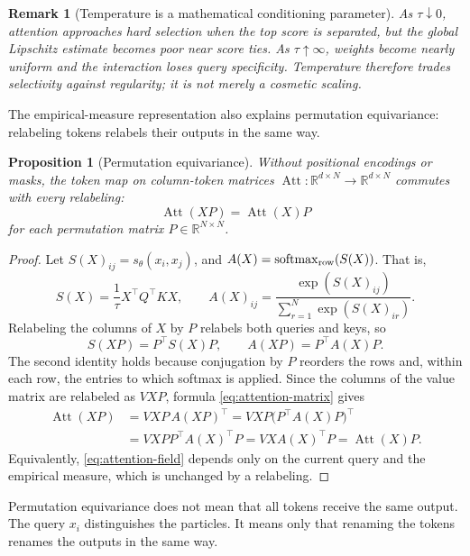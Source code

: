 \documentclass[11pt]{amsart}
\numberwithin{equation}{section}
\theoremstyle{plain}
\newtheorem{proposition}[theorem]{Proposition}
\newtheorem{remark}[theorem]{Remark}
\newcommand{\R}{\mathbb{R}}
\begin{document}
\begin{remark}[Temperature is a mathematical conditioning parameter]
As $\tau\downarrow0$, attention approaches hard selection when the top score is
separated, but the global Lipschitz estimate becomes poor near score ties.  As
$\tau\uparrow\infty$, weights become nearly uniform and the interaction loses
query specificity.  Temperature therefore trades selectivity against
regularity; it is not merely a cosmetic scaling.
\end{remark}

The empirical-measure representation also explains permutation equivariance:
relabeling tokens relabels their outputs in the same way.
\begin{proposition}[Permutation equivariance]\label{prop:perm-equiv}
Without positional encodings or masks, the token map on column-token matrices
$\operatorname{Att}:\R^{d\times N}\to\R^{d\times N}$ commutes with every
relabeling:
\[
  \operatorname{Att}(XP)=\operatorname{Att}(X)P
\]
for each permutation matrix $P\in\R^{N\times N}$.
\end{proposition}
\begin{proof}
Let $S(X)_{ij}=s_\theta(x_i,x_j)$,  and
$A(X)=\operatorname{softmax}_{\rm row}(S(X)) $. That is,
\[
 S(X)=\frac1\tau X^\top Q^\top KX,\qquad
 A(X)_{ij}=\frac{\exp(S(X)_{ij})}{\sum_{r=1}^N\exp(S(X)_{ir})}.
\]
Relabeling the columns of
$X$ by $P$ relabels both queries and keys, so
\[
 S(XP)=P^\top S(X)P,
 \qquad
 A(XP)=P^\top A(X)P.
\]
The second identity holds because conjugation by $P$ reorders the rows and,
within each row, the entries to which softmax is applied.  Since the columns
of the value matrix are relabeled as $VXP$, formula
\eqref{eq:attention-matrix} gives
\[
\begin{split}
 \operatorname{Att}(XP)
 &=VXP\,A(XP)^\top
  =VXP\bigl(P^\top A(X)P\bigr)^\top\\
 &=VXP P^\top A(X)^\top P
  =VXA(X)^\top P
  =\operatorname{Att}(X)P.
\end{split}
\]
Equivalently, \eqref{eq:attention-field} depends only on the current query
and the empirical measure, which is unchanged by a relabeling.
\end{proof}

Permutation equivariance does not mean that all tokens receive the same output.  The query $x_i$ distinguishes the particles.  It means only that
renaming the tokens renames the outputs in the same way.
\end{document}
